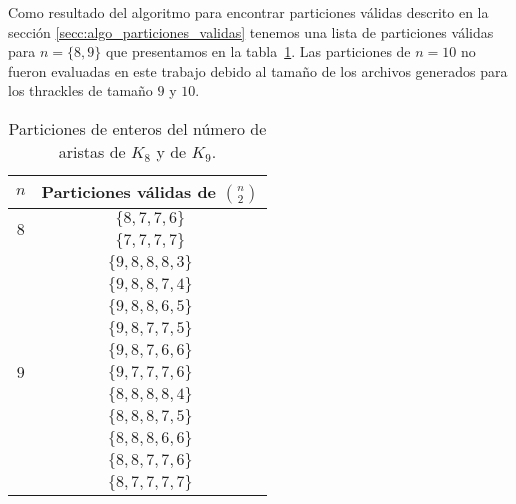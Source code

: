   Como resultado del algoritmo para encontrar particiones válidas descrito en la sección
  \ref{secc:algo_particiones_validas} tenemos una lista de particiones válidas para
  $n=\{8,9\}$ que presentamos en la tabla~\ref{tabla:particionesk8k9_2}. Las particiones
  de $n=10$ no fueron evaluadas en este trabajo debido al tamaño de los archivos
  generados para los thrackles de tamaño $9$ y $10$.
  \begin{table}[t]
    \centering
    \begin{tabular}{|c|c|}
      \hline
      $n$                       & Particiones válidas de $\displaystyle\binom{n}{2}$ \\ \hline\hline
      \multirow{2}{*}{$ 8 $}    & $\{8,7,7,6\}$ \\ \cline{2-2}
                                & $\{7,7,7,7\}$ \\ \hline
      \multirow{11}{*}{$ 9 $}   &$\{9,8,8,8,3\}$ \\ \cline{2-2}
                                &$\{9,8,8,7,4\}$ \\ \cline{2-2}
                                &$\{9,8,8,6,5\}$ \\ \cline{2-2}
                                &$\{9,8,7,7,5\}$ \\ \cline{2-2}
                                &$\{9,8,7,6,6\}$ \\ \cline{2-2}
                                &$\{9,7,7,7,6\}$ \\ \cline{2-2}
                                &$\{8,8,8,8,4\}$ \\ \cline{2-2}
                                &$\{8,8,8,7,5\}$ \\ \cline{2-2}
                                &$\{8,8,8,6,6\}$ \\ \cline{2-2}
                                &$\{8,8,7,7,6\}$ \\ \cline{2-2}
                                &$\{8,7,7,7,7\}$ \\ \hline
    \end{tabular}
    \caption{Particiones de enteros del número de aristas de $K_8$ y de $K_9$. }
    \label{tabla:particionesk8k9_2}
  \end{table}

